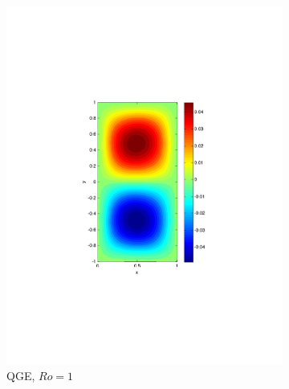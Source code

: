 \begin{figure}
\begin{center}
\begin{subfigure}{0.4\textwidth}
    \includegraphics[scale=0.5]{Figures/Re200Ro1h16k1000}
    \caption{QGE, $Ro=1$}
    \label{sfi:QGERo1}
  \end{subfigure}
  \begin{subfigure}{0.3\textwidth}
    \centering

\end{subfigure}
\end{center}
\end{figure}
